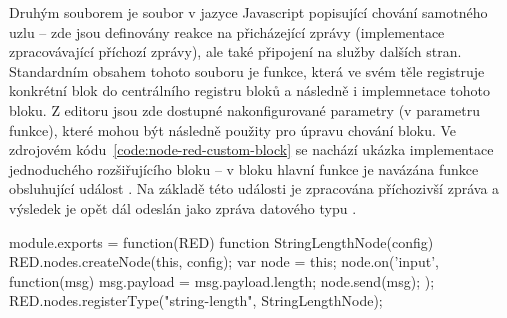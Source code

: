 Druhým souborem je soubor v jazyce Javascript popisující chování samotného uzlu -- zde jsou definovány reakce na
přicházející zprávy (implementace zpracovávající příchozí zprávy), ale také připojení na služby dalších stran.
Standardním obsahem tohoto souboru je funkce, která ve svém těle registruje konkrétní blok do centrálního registru
bloků a následně i implemnetace tohoto bloku.
Z editoru jsou zde dostupné nakonfigurované parametry (v parametru funkce), které mohou být následně použity pro
úpravu chování bloku.
Ve zdrojovém kódu~\ref{code:node-red-custom-block} se nachází ukázka implementace jednoduchého rozšiřujícího bloku --
v bloku hlavní funkce je navázána funkce obsluhující událost .
Na základě této události je zpracována příchozivší zpráva a výsledek je opět dál odeslán jako zpráva datového typu
.

\begin{code}[%
    caption={Ukázka implementace vlastního rozšiřujícího bloku do nástroje Node-RED.},
    label=code:node-red-custom-block,
    language=Javascript
]
module.exports = function(RED) {
    function StringLengthNode(config) {
        RED.nodes.createNode(this, config);
        var node = this;
        node.on('input', function(msg) {
            msg.payload = msg.payload.length;
            node.send(msg);
        });
    }
    RED.nodes.registerType("string-length", StringLengthNode);
}
\end{code}


